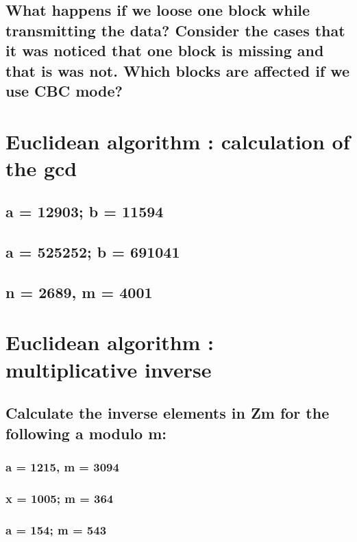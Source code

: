 \subsection{What happens if we loose one block while transmitting the data? Consider the cases that it was noticed that one block is missing and that is was not. Which blocks are affected if we use CBC mode?}
\label{sec:2d}

\section{Euclidean algorithm : calculation of the gcd}

\subsection{a = 12903; b = 11594}
\label{sec:3a}

\subsection{a = 525252; b = 691041}
\label{sec:3b}

\subsection{n = 2689, m = 4001}
\label{sec:3c}

\section{Euclidean algorithm : multiplicative inverse}

\subsection{Calculate the inverse elements in Zm for the following a modulo m:}
\label{sec:4a}

\subsubsection{a = 1215, m = 3094}
\label{sec:4aa}

\subsubsection{x = 1005; m = 364}
\label{sec:4ab}

\subsubsection{a = 154; m = 543}
\label{sec:4ac}


